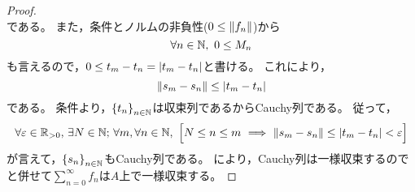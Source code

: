 \documentclass[b5paper,draft]{ltjsbook}
\begin{document}
\begin{thm}
\begin{proof}
\begin{equation}
        \end{equation}
        である。
        また，条件とノルムの非負性($0\leq \norm{f_n}$)から
        \begin{equation}
            \forall n\in \N,\ 0\leq M_n
        \end{equation}
        も言えるので，$0\leq t_m-t_n=\abs{t_m-t_n}$と書ける。
        これにより，
        \begin{equation}
            \norm{s_m-s_n}\leq \abs{t_m-t_n}
        \end{equation}
        である。
        条件より，$\seq{t_n}{n\in\N}$は収束列であるからCauchy列である。
        従って，
        \begin{equation}
            \forall\varepsilon\in\Rposi,\,\exists N\in\N;\, \forall m,\forall n\in\N,\ \bsqu{
                N\leq n\leq m\ \Longrightarrow\ \norm{s_m-s_n}\leq \abs{t_m-t_n}<\varepsilon
            }
        \end{equation}
        が言えて，$\seq{s_n}{n\in\N}$もCauchy列である。
        により，Cauchy列は一様収束するのでと併せて$\sum_{n=0}^\infty f_n$は$A$上で一様収束する。
    \end{proof}
\end{thm}
\end{document}
